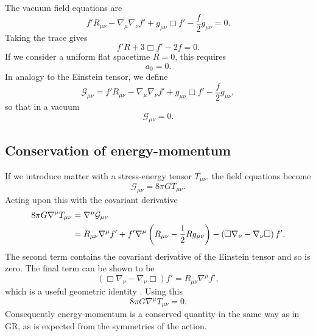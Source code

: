 The vacuum field equations are
\begin{equation}
f'R_{\mu\nu} - \nabla_\mu\nabla_\nu f' + g_{\mu\nu}\Box f' - \frac{f}{2}g_{\mu\nu} = 0.
\label{eq:Field_eq}
\end{equation}
Taking the trace gives
\begin{equation}
f'R + 3\Box f' - 2f = 0.
\label{eq:Trace_eq}
\end{equation}
If we consider a uniform flat spacetime $R = 0$, this requires \citep{Capozziello2007}
\begin{equation}
a_0 = 0.
\label{eq:a_0}
\end{equation}
In analogy to the Einstein tensor, we define
\begin{equation}
\mathcal{G}_{\mu\nu} = f'R_{\mu\nu} - \nabla_\mu\nabla_\nu f' + g_{\mu\nu}\Box f' - \frac{f}{2}g_{\mu\nu},
\label{eq:G_tensor}
\end{equation}
so that in a vacuum
\begin{equation}
\mathcal{G}_{\mu\nu} = 0.
\end{equation}

\subsection{Conservation of energy-momentum}

If we introduce matter with a stress-energy tensor $T_{\mu\nu}$, the field equations become
\begin{equation}
\mathcal{G}_{\mu\nu} = 8\pi GT_{\mu\nu}.
\end{equation}
Acting upon this with the covariant derivative
\begin{align}
8\pi G\nabla^\mu T_{\mu\nu} = {} & \nabla^\mu\mathcal{G}_{\mu\nu} \nonumber \\*
 = {} & R_{\mu\nu}\nabla^\mu f' + f'\nabla^\mu\left(R_{\mu\nu} - \frac{1}{2}R g_{\mu\nu}\right) - \left(\Box\nabla_\nu - \nabla_\nu\Box\right)f'.
\end{align}
The second term contains the covariant derivative of the Einstein tensor and so is zero. The final term can be shown to be
\begin{equation}
\left(\Box\nabla_\nu - \nabla_\nu\Box\right)f' = R_{\mu\nu}\nabla^\mu f',
\end{equation}
which is a useful geometric identity \citep{Koivisto2006a}. Using this
\begin{equation}
8\pi G\nabla^\mu T_{\mu\nu} = 0.
\end{equation}
Consequently energy-momentum is a conserved quantity in the same way as in GR, as is expected from the symmetries of the action.

